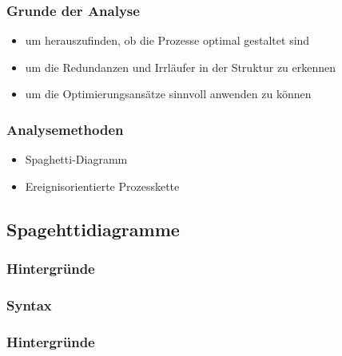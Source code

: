 \documentclass{beamer}
\begin{document}
  \begin{frame}
    \frametitle{Grunde der Analyse}
 	 \begin{itemize}
  		\item um herauszufinden, ob die Prozesse optimal gestaltet sind 
  		\item um die Redundanzen und Irrläufer in der Struktur zu erkennen 
  		\item um die Optimierungsansätze sinnvoll anwenden zu können
  	\end{itemize}
  \end{frame}

 
 \begin{frame}
  \frametitle{Analysemethoden}
  
  \begin{itemize}
 	 \item Spaghetti-Diagramm
  	\item Ereignisorientierte Prozesskette
  \end{itemize}
  
   
 \end{frame}

 \subsection[Spaghettidiagramme]{Spagehttidiagramme}
 \begin{frame}
  \frametitle{Hintergründe}

 \end{frame}

 \subsubsection[Syntax]{Syntax}
 \begin{frame}
  \frametitle{Hintergründe}

 \end{frame}
\end{document}
